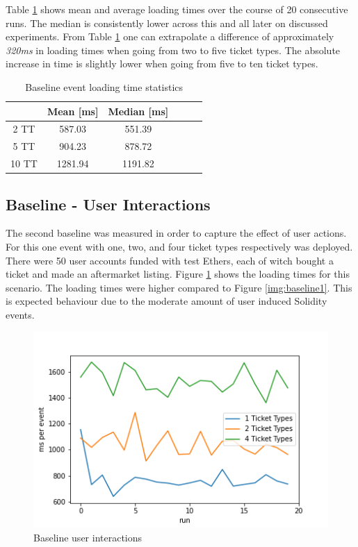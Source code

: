 Table \ref{tab:baseline1} shows mean and average loading times over the course of 20 consecutive runs. The median is consistently lower across this and all later on discussed experiments.
From Table \ref{tab:baseline1} one can extrapolate a difference of approximately \textit{320ms} in loading times when going from two to five ticket types. The absolute increase in time is slightly lower when going from five to ten ticket types.  

\begin{table}[ht]
\centering
\begin{tabular}{|c|c|c|c|c|c|}
\hline
 & \textbf{Mean [ms]} & \textbf{Median [ms]} \\ \hline
2 TT & 587.03               & 551.39         \\ \hline
5 TT & 904.23               & 878.72         \\ \hline
10 TT & 1281.94               & 1191.82         \\ \hline
\end{tabular}
\caption{Baseline event loading time statistics}
\label{tab:baseline1}
\end{table}

\subsection{Baseline - User Interactions}\label{section:bl-user}


The second baseline was measured in order to capture the effect of user actions. For this one event with one, two, and four ticket types respectively was deployed. There were 50 user accounts funded with test Ethers, each of witch bought a ticket and made an aftermarket listing. Figure \ref{img:baseline2} shows the loading times for this scenario. The loading times were higher compared to Figure \ref{img:baseline1}. This is expected behaviour due to the moderate amount of user induced Solidity events.
\begin{figure}[H]
    \centering
    \includegraphics[width=14cm]{images/plot2.png}
    \caption{Baseline user interactions}
    \label{img:baseline2}
\end{figure}

